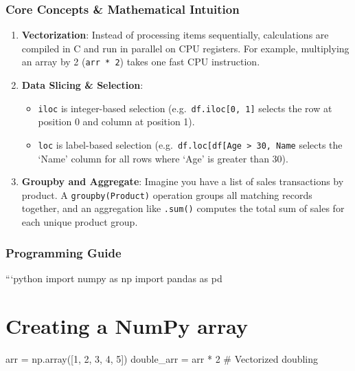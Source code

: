 \subsubsection{Core Concepts \& Mathematical
Intuition}\label{core-concepts-mathematical-intuition}

\begin{enumerate}
\def\labelenumi{\arabic{enumi}.}
\tightlist
\item
  \textbf{Vectorization}: Instead of processing items sequentially,
  calculations are compiled in C and run in parallel on CPU registers.
  For example, multiplying an array by 2 (\texttt{arr\ *\ 2}) takes one
  fast CPU instruction.
\item
  \textbf{Data Slicing \& Selection}:

  \begin{itemize}
  \tightlist
  \item
    \texttt{iloc} is integer-based selection
    (e.g.~\texttt{df.iloc{[}0,\ 1{]}} selects the row at position 0 and
    column at position 1).
  \item
    \texttt{loc} is label-based selection
    (e.g.~\texttt{df.loc{[}df{[}\textquotesingle{}Age\textquotesingle{}{]}\ \textgreater{}\ 30,\ \textquotesingle{}Name\textquotesingle{}{]}}
    selects the `Name' column for all rows where `Age' is greater than
    30).
  \end{itemize}
\item
  \textbf{Groupby and Aggregate}: Imagine you have a list of sales
  transactions by product. A
  \texttt{groupby(\textquotesingle{}Product\textquotesingle{})}
  operation groups all matching records together, and an aggregation
  like \texttt{.sum()} computes the total sum of sales for each unique
  product group.
\end{enumerate}

\subsubsection{Programming Guide}\label{programming-guide}

```python import numpy as np import pandas as pd

\section{Creating a NumPy array}\label{creating-a-numpy-array}

arr = np.array({[}1, 2, 3, 4, 5{]}) double\_arr = arr * 2 \# Vectorized
doubling

